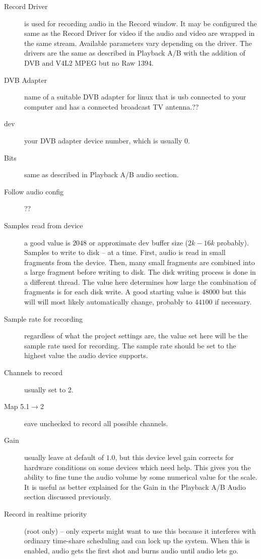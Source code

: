 \begin{description}
    \item[Record Driver] is used for recording audio in the Record window. It may be configured the same as the Record Driver for video if the audio and video are wrapped in the same stream. Available parameters vary depending on the driver.  The drivers are the same as described in Playback A/B with the addition of DVB and V4L2 MPEG but no Raw 1394.
    \item[DVB Adapter] name of a suitable DVB adapter for linux that is usb connected to your computer and has a connected broadcast TV antenna.??
    \item[dev] your DVB adapter device number, which is usually 0.
    \item[Bits] same as described in Playback A/B audio section.
    \item[Follow audio config] ??
    \item[Samples read from device] a good value is $2048$ or approximate dev buffer size ($2k-16k$ probably).
    Samples to write to disk -- at a time. First, audio is read in small fragments from the device. Then, many small fragments are combined into a large fragment before writing to disk. The disk writing process is done in a different thread. The value here determines how large the combination of fragments is for each disk write.  A good starting value is $48000$ but this will will most likely automatically change, probably to $44100$ if necessary.
    \item[Sample rate for recording] regardless of what the project settings are, the value set here will be the sample rate used for recording. The sample rate should be set to the highest value the audio device supports.
    \item[Channels to record] usually set to 2.
    \item[Map 5.1$\rightarrow$2] eave unchecked to record all possible channels.
    \item[Gain] usually leave at default of $1.0$, but this device level gain corrects for hardware conditions on some devices which need  help.  This gives you the ability to fine tune the audio volume by some numerical value for the scale.  It is useful as better explained for the Gain in the Playback A/B Audio section discussed previously.
    \item[Record in realtime priority] (root only) -- only experts might want to use this because it interferes with ordinary time-share scheduling and can lock up the system.  When this is enabled, audio gets the first shot and burns audio until audio lets go.
\end{description}

